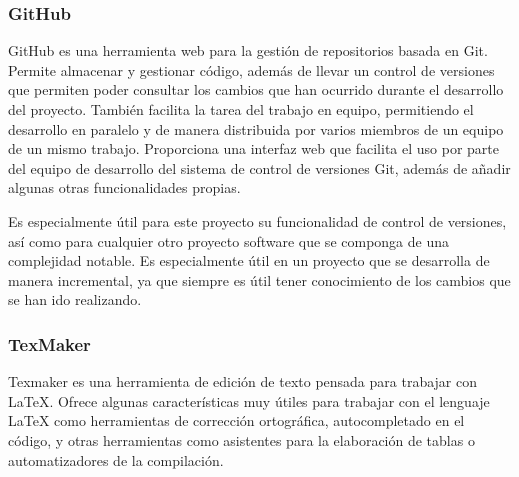 \subsubsection{GitHub}

GitHub \cite{GitHub} es una herramienta web para la gestión de repositorios  basada en Git\cite{Git}. Permite almacenar y gestionar código, además de llevar un control de versiones que permiten poder consultar los cambios que han ocurrido durante el desarrollo del proyecto. También facilita la tarea del trabajo en equipo, permitiendo el desarrollo en paralelo y de manera distribuida por varios miembros de un equipo de un mismo trabajo. Proporciona una interfaz web que facilita el uso por parte del equipo de desarrollo del sistema de control de versiones Git, además de añadir algunas otras funcionalidades propias.

Es especialmente útil para este proyecto su funcionalidad de control de versiones, así como para cualquier otro proyecto software que se componga de una complejidad notable. Es especialmente útil en un proyecto que se desarrolla de manera incremental, ya que siempre es útil tener conocimiento de los cambios que se han ido realizando.

\subsubsection{TexMaker}

Texmaker es una herramienta de edición de texto pensada para trabajar con LaTeX. Ofrece algunas características muy útiles para trabajar con el lenguaje LaTeX como herramientas de corrección ortográfica, autocompletado en el código, y otras herramientas como asistentes para la elaboración de tablas o automatizadores de la compilación.



 